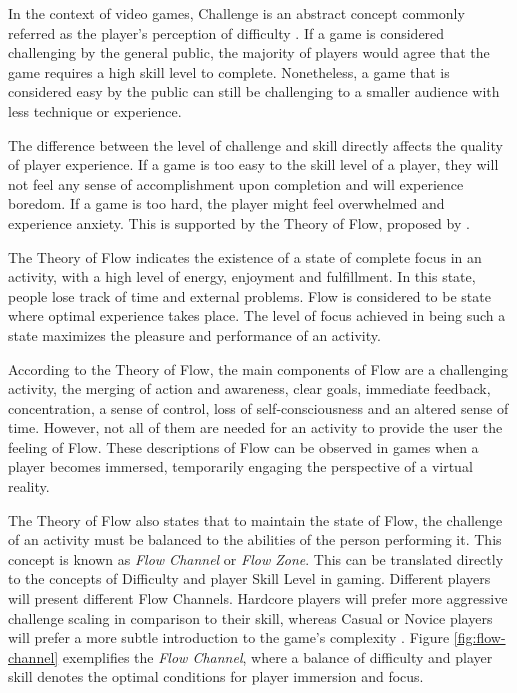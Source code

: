 \documentclass[cic,tc,english]{iiufrgs}
\begin{document}
In the context of video games, Challenge is an abstract concept commonly referred as the player's perception of difficulty \cite{ARTICLE_RoleOfChallenge}. If a game is considered challenging by the general public, the majority of players would agree that the game requires a high skill level to complete. Nonetheless, a game that is considered easy by the public can still be challenging to a smaller audience with less technique or experience.

The difference between the level of challenge and skill directly affects the quality of player experience. If a game is too easy to the skill level of a player, they will not feel any sense of accomplishment upon completion and will experience boredom. If a game is too hard, the player might feel overwhelmed and experience anxiety. This is supported by the Theory of Flow, proposed by \cite{BOOK_Flow}.

The Theory of Flow indicates the existence of a state of complete focus in an activity, with a high level of energy, enjoyment and fulfillment. In this state, people lose track of time and external problems. Flow is considered to be state where optimal experience takes place. The level of focus achieved in being such a state maximizes the pleasure and performance of an activity.

According to the Theory of Flow, the main components of Flow are a challenging activity, the merging of action and awareness, clear goals, immediate feedback, concentration, a sense of control, loss of self-consciousness and an altered sense of time. However, not all of them are needed for an activity to provide the user the feeling of Flow. These descriptions of Flow can be observed in games when a player becomes immersed, temporarily engaging the perspective of a virtual reality.

The Theory of Flow also states that to maintain the state of Flow, the challenge of an activity must be balanced to the abilities of the person performing it. This concept is known as \emph{Flow Channel} or \emph{Flow Zone}. This can be translated directly to the concepts of Difficulty and player Skill Level in gaming. Different players will present different Flow Channels. Hardcore players will prefer more aggressive challenge scaling in comparison to their skill, whereas Casual or Novice players will prefer a more subtle introduction to the game's complexity \cite{ARTICLE_FlowInGames}. Figure \ref{fig:flow-channel} exemplifies the \emph{Flow Channel}, where a balance of difficulty and player skill denotes the optimal conditions for player immersion and focus.
\end{document}
